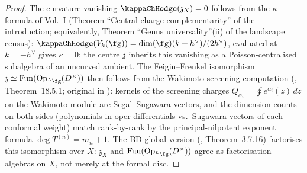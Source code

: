 \begin{proof}
The curvature vanishing $\kappaChHodge(\mathfrak{z}_X)=0$ follows from the
$\kappa$-formula of Vol.~I \textup{(}Theorem ``Central charge
complementarity'' of the introduction; equivalently, Theorem
``Genus universality''(ii) of the landscape census\textup{)}:
$\kappaChHodge(V_k(\fg)) = \dim(\fg)(k+h^\vee)/(2h^\vee)$, evaluated at
$k = -h^\vee$ gives $\kappa = 0$; the centre $\mathfrak{z}$ inherits
this vanishing as a Poisson-centralised subalgebra of an uncurved
ambient. The Feigin--Frenkel isomorphism $\mathfrak{z} \simeq
\mathrm{Fun}(\mathrm{Op}_{{}^L\fg}(D^\times))$ then follows from the
Wakimoto-screening computation (\cite{FBZ04}, Theorem~18.5.1;
original in \cite{FF92}): kernels of the screening charges
$Q_{\alpha_i} = \oint e^{\alpha_i}(z)\,dz$ on the Wakimoto module
are Segal--Sugawara vectors, and the dimension counts on both sides
(polynomials in oper differentials vs.\ Sugawara vectors of each
conformal weight) match rank-by-rank by the principal-nilpotent
exponent formula $\deg T^{(n)} = m_n + 1$. The BD global version
(\cite{BD04}, Theorem~3.7.16) factorises this isomorphism over $X$:
$\mathfrak{z}_X$ and $\mathrm{Fun}(\mathrm{Op}_{{}^L\fg}(D^\times))$
agree as factorisation algebras on $X$, not merely at the formal
disc.


\end{proof}

